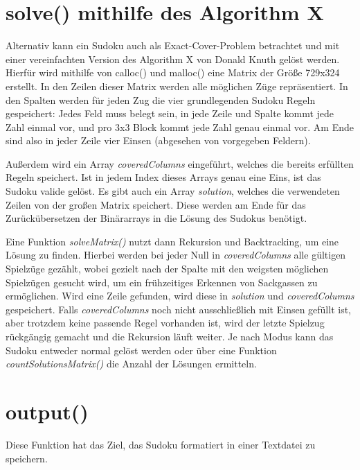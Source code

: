 \documentclass[a4paper,10pt]{article}
\begin{document}
\section{solve() mithilfe des Algorithm X}

Alternativ kann ein Sudoku auch als Exact-Cover-Problem betrachtet und mit einer vereinfachten Version des Algorithm X von Donald Knuth gelöst werden. Hierfür wird mithilfe von calloc() und malloc() eine Matrix der Größe 729x324 erstellt. In den Zeilen dieser Matrix werden alle möglichen Züge repräsentiert. In den Spalten werden für jeden Zug die vier grundlegenden Sudoku Regeln gespeichert: Jedes Feld muss belegt sein, in jede Zeile und Spalte kommt jede Zahl einmal vor, und pro 3x3 Block kommt jede Zahl genau einmal vor. Am Ende sind also in jeder Zeile vier Einsen (abgesehen von vorgegeben Feldern).

Außerdem wird ein Array \textit{coveredColumns} eingeführt, welches die bereits erfüllten Regeln speichert. Ist in jedem Index dieses Arrays genau eine Eins, ist das Sudoku valide gelöst. Es gibt auch ein Array \textit{solution}, welches die verwendeten Zeilen von der großen Matrix speichert. Diese werden am Ende für das Zurückübersetzen der Binärarrays in die Lösung des Sudokus benötigt. 

Eine Funktion \textit{solveMatrix()} nutzt dann Rekursion und Backtracking, um eine Lösung zu finden. Hierbei werden bei jeder Null in \textit{coveredColumns} alle gültigen Spielzüge gezählt, wobei gezielt nach der Spalte mit den weigsten möglichen Spielzügen gesucht wird, um ein frühzeitiges Erkennen von Sackgassen zu ermöglichen. Wird eine Zeile gefunden, wird diese in \textit{solution} und \textit{coveredColumns} gespeichert. Falls \textit{coveredColumns} noch nicht ausschließlich mit Einsen gefüllt ist, aber trotzdem keine passende Regel vorhanden ist, wird der letzte Spielzug rückgängig gemacht und die Rekursion läuft weiter. Je nach Modus kann das Sudoku entweder normal gelöst werden oder über eine Funktion \textit{countSolutionsMatrix()} die Anzahl der Lösungen ermitteln.

\section{output()}

Diese Funktion hat das Ziel, das Sudoku formatiert in einer Textdatei zu speichern. 
\end{document}
